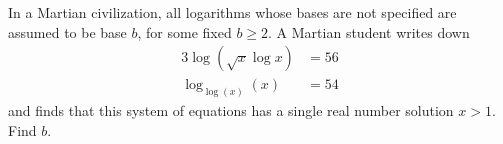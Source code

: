In a Martian civilization, all logarithms whose bases are not specified are assumed to be base $b$, for some fixed $b \geq 2$. A Martian student writes down
\begin{align*}3 \log(\sqrt{x}\log x) &= 56\\\log_{\log (x)}(x) &= 54
\end{align*}and finds that this system of equations has a single real number solution $x > 1$. Find $b$.